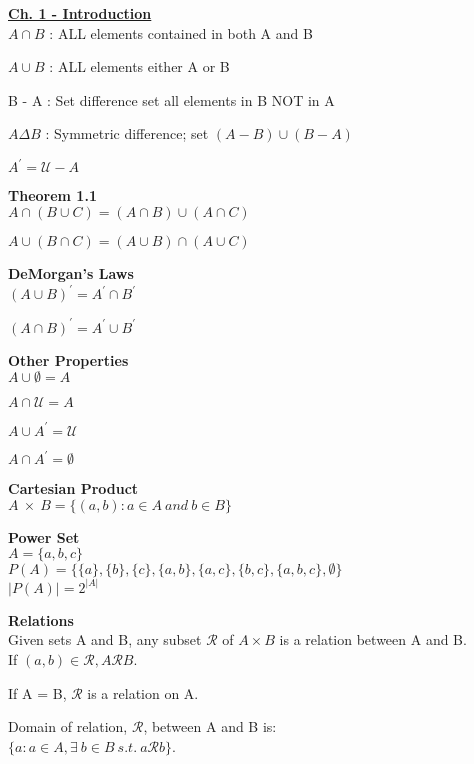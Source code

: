 \documentclass{article}
\date{} %
\begin{document}
\textbf{\underline{Ch. 1 - Introduction}}\\

$ A \cap B $ : ALL elements contained in both A and B

$ A \cup B $ : ALL elements either A or B

B - A : Set difference set all elements in B NOT in A

$ A \Delta B $ : Symmetric difference; set $ (A-B) \cup (B-A) $ 

$ A^{'} = \mathcal{U} - A $
\newline

\textbf{Theorem 1.1}\\

$ A \cap (B \cup C) = (A \cap B) \cup (A \cap C) $

$ A \cup (B \cap C) = (A \cup B) \cap (A \cup C) $
\newline

\textbf{DeMorgan's Laws}\\
$ {(A \cup B)}^{'} = A^{'} \cap B^{'} $

$ {(A \cap B)}^{'} = A^{'} \cup B^{'} $
\newline

\textbf{Other Properties}\\
$ A \cup \emptyset  = A $

$ A \cap \mathcal{U} = A $

$ A \cup A^{'} = \mathcal{U} $

$ A \cap A^{'} = \emptyset $
\newpage %

\textbf{Cartesian Product}\\
$ A \ \times \ B = \{(a,b): a \in A \ and \ b \in B \} $
\newline

\textbf{Power Set}\\

$ A = \{a,b,c\} $\\
$ P(A) = \{ \{a\}, \{b\}, \{c\}, \{a,b\}, \{a,c\}, \{b,c\}, \{a,b,c\}, \emptyset \} $\\
$ |P(A)| = 2^{|A|} $
\newline

\textbf{Relations}\\
Given sets A and B, any subset $\mathcal{R}$ of $A \times B$ is a relation between A and B.\\
If $(a,b) \in \mathcal{R}, A\mathcal{R}B $.

If A = B, $\mathcal{R}$ is a relation on A.

Domain of relation, $\mathcal{R}$, between A and B is:\\
$\{ a : a \in A, \exists \ b \in B \ s.t. \ a\mathcal{R}b \}$.
\end{document}
